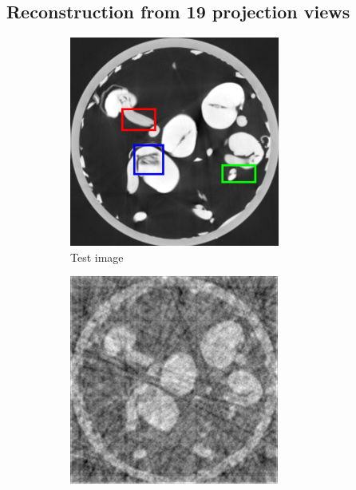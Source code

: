 \documentclass{article}
\begin{document}
\newpage
\subsection{Reconstruction from 19 projection views}
\begin{figure}[h]
    \begin{subfigure}[b]{0.3\linewidth}
        \includegraphics[width=\textwidth]{../images/supplementary/2D_sprouts/colorTestIm.png}
        \caption{Test image}
     \end{subfigure}
    \begin{subfigure}[b]{0.3\linewidth}
        \includegraphics[width=\textwidth]{../images/supplementary/2D_sprouts/19_angles/1/fbp.png}

\end{subfigure}
\end{figure}
\end{document}
